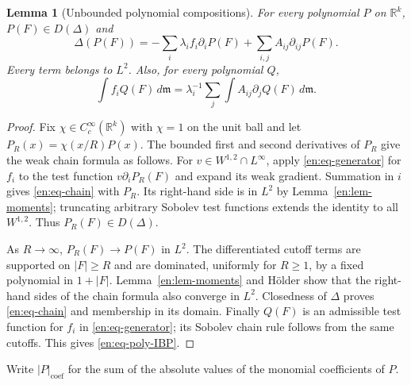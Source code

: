 \documentclass[12pt]{amsart}
\newtheorem{lem}[thm]{Lemma}
\theoremstyle{definition}
\theoremstyle{remark}
\numberwithin{equation}{section}
\newcommand{\R}{\mathbb{R}}
\newcommand{\m}{\mathfrak m}
\theoremstyle{jpplain}
\begin{document}
\begin{lem}[Unbounded polynomial compositions]\label{en:lem-domain}
For every polynomial $P$ on $\R^k$, $P(F)\in D(\Delta)$ and
\begin{equation}\label{en:eq-chain}
 \Delta(P(F))=-\sum_i\lambda_i f_i\partial_iP(F)
              +\sum_{i,j}A_{ij}\partial_{ij}P(F).
\end{equation}
Every term belongs to $L^2$.  Also, for every polynomial $Q$,
\begin{equation}\label{en:eq-poly-IBP}
 \int f_iQ(F)\,d\m
 =\lambda_i^{-1}\sum_j\int A_{ij}\partial_jQ(F)\,d\m.
\end{equation}
\end{lem}
\begin{proof}
Fix $\chi\in C_c^\infty(\R^k)$ with $\chi=1$ on the unit ball and let
$P_R(x)=\chi(x/R)P(x)$.  The bounded first and second derivatives of
$P_R$ give the weak chain formula as follows.  For
$v\in W^{1,2}\cap L^\infty$, apply \eqref{en:eq-generator} for $f_i$ to
the test function $v\partial_iP_R(F)$ and expand its weak gradient.
Summation in $i$ gives \eqref{en:eq-chain} with $P_R$.
Its right-hand side is in $L^2$ by Lemma~\ref{en:lem-moments}; truncating
arbitrary Sobolev test functions extends the identity to all $W^{1,2}$.
Thus $P_R(F)\in D(\Delta)$.

As $R\to\infty$, $P_R(F)\to P(F)$ in $L^2$.  The differentiated cutoff
terms are supported on $|F|\geq R$ and are dominated, uniformly for
$R\geq1$, by a fixed polynomial in $1+|F|$.  Lemma~\ref{en:lem-moments}
and Hölder show that the right-hand sides of the chain formula also
converge in $L^2$.  Closedness of $\Delta$ proves
\eqref{en:eq-chain} and membership in its domain.  Finally $Q(F)$ is
an admissible test function for $f_i$ in \eqref{en:eq-generator}; its
Sobolev chain rule follows from the same cutoffs.  This gives
\eqref{en:eq-poly-IBP}.
\end{proof}

Write $|P|_{\mathrm{coef}}$ for the sum of the absolute values of the
monomial coefficients of $P$.
\end{document}
